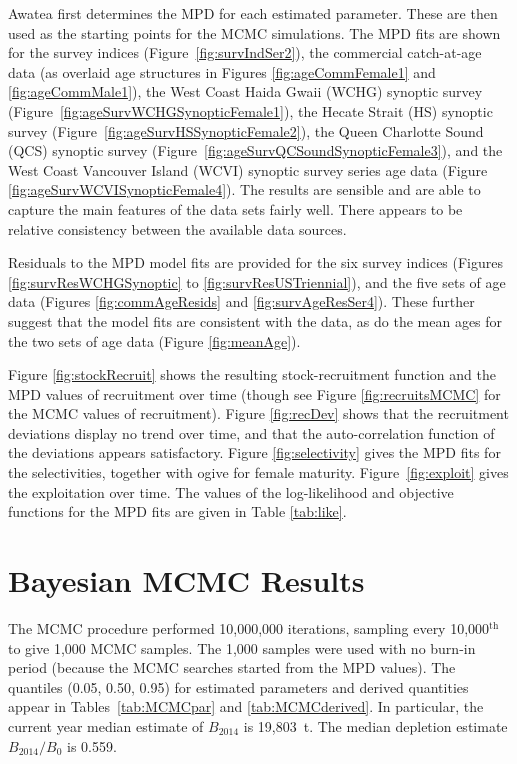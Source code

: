 \documentclass[11pt]{book}
\begin{document}
Awatea first determines the MPD for each estimated parameter.  These are then used as the starting points for the MCMC simulations. The MPD fits are shown for the survey indices (Figure~\ref{fig:survIndSer2}), the commercial catch-at-age data (as overlaid age structures in Figures \ref{fig:ageCommFemale1} and \ref{fig:ageCommMale1}), the West Coast Haida Gwaii (WCHG) synoptic survey (Figure~\ref{fig:ageSurvWCHGSynopticFemale1}), the Hecate Strait (HS) synoptic survey (Figure~\ref{fig:ageSurvHSSynopticFemale2}), the Queen Charlotte Sound (QCS) synoptic survey (Figure~\ref{fig:ageSurvQCSoundSynopticFemale3}), and the West Coast Vancouver Island (WCVI) synoptic survey series age data (Figure \ref{fig:ageSurvWCVISynopticFemale4}). The results are sensible and are able to capture the main features of the data sets fairly well. There appears to be relative consistency between the available data sources.

Residuals to the MPD model fits are provided for the six survey indices (Figures \ref{fig:survResWCHGSynoptic} to \ref{fig:survResUSTriennial}), and the five sets of age data (Figures \ref{fig:commAgeResids} and \ref{fig:survAgeResSer4}). These further suggest that the model fits are consistent with the data, as do the mean ages for the two sets of age data (Figure \ref{fig:meanAge}).

Figure \ref{fig:stockRecruit} shows the resulting stock-recruitment function and the MPD values of recruitment over time (though see Figure \ref{fig:recruitsMCMC} for the MCMC values of recruitment). Figure \ref{fig:recDev} shows that the recruitment deviations display no trend over time, and that the auto-correlation function of the deviations appears satisfactory. Figure \ref{fig:selectivity} gives the MPD fits for the selectivities, together with ogive for female maturity. Figure~\ref{fig:exploit} gives the exploitation over time. The values of the log-likelihood and objective functions for the MPD fits are given in Table \ref{tab:like}.

\section{Bayesian MCMC Results}

The MCMC procedure performed 10,000,000 iterations, sampling every 10,000$^\mathrm{th}$ to give 1,000 MCMC samples.  The 1,000 samples were used with no burn-in period (because the MCMC searches started from the MPD values). The quantiles (0.05, 0.50, 0.95) for estimated parameters and derived quantities appear in Tables~\ref{tab:MCMCpar} and \ref{tab:MCMCderived}. In particular, the current year median estimate of $B_{2014}$ is 19,803~t. The median depletion estimate $B_{2014}/B_0$ is  0.559.
\end{document}
